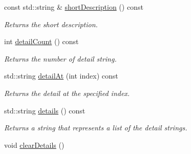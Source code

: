 \begin{DoxyCompactItemize}
\item 
const std\+::string \& \hyperlink{class_message_aa22497c35079e8619c516f693d1fd97f}{short\+Description} () const 
\begin{DoxyCompactList}\small\item\em Returns the short description. \end{DoxyCompactList}\item 
int \hyperlink{class_message_a312fc09ce16cb1414a0efd2458defc21}{detail\+Count} () const 
\begin{DoxyCompactList}\small\item\em Returns the number of detail string. \end{DoxyCompactList}\item 
std\+::string \hyperlink{class_message_ad2fea61f003bfbe810ce8149f2faf6a2}{detail\+At} (int index) const 
\begin{DoxyCompactList}\small\item\em Returns the detail at the specified index. \end{DoxyCompactList}\item 
std\+::string \hyperlink{class_message_aacec5052940b4e18a35bb3f363f05cc4}{details} () const 
\begin{DoxyCompactList}\small\item\em Returns a string that represents a list of the detail strings. \end{DoxyCompactList}\item 
void \hyperlink{class_message_af5a1d2f3def9208bb603587f79c5d711}{clear\+Details} ()\hypertarget{class_message_af5a1d2f3def9208bb603587f79c5d711}{}\label{class_message_af5a1d2f3def9208bb603587f79c5d711}


\end{DoxyCompactItemize}
